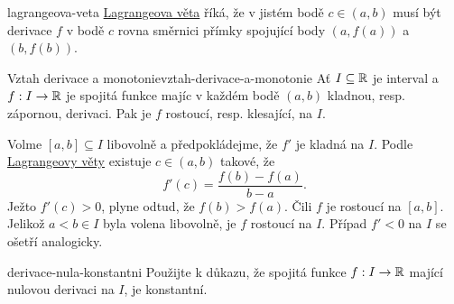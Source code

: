 \begin{remark}{}{lagrangeova-veta}
 \hyperref[thm:lagrangeova-o-stredni-hodnote]{Lagrangeova věta} říká, že v
 jistém bodě $c \in (a,b)$ musí být derivace $f$ v bodě $c$ rovna směrnici
 přímky spojující body $(a,f(a))$ a $(b,f(b))$.
\end{remark}

\begin{corollary}{Vztah derivace a monotonie}{vztah-derivace-a-monotonie}
 Ať $I \subseteq \mathbb{R}$ je interval a $f:I \to \mathbb{R}$ je spojitá funkce majíc v každém
 bodě $(a,b)$ kladnou, resp. zápornou, derivaci. Pak je $f$ rostoucí, resp.
 klesající, na $I$.
\end{corollary}
\begin{corproof}
 Volme $[a,b] \subseteq I$ libovolně a předpokládejme, že $f'$ je kladná na $I$.
 Podle \hyperref[thm:lagrangeova-o-stredni-hodnote]{Lagrangeovy věty} existuje
 $c \in (a,b)$ takové, že
 \[
  f'(c) = \frac{f(b) - f(a)}{b - a}.
 \]
 Ježto $f'(c) > 0$, plyne odtud, že $f(b) > f(a)$. Čili $f$ je rostoucí na
 $[a,b]$. Jelikož $a < b \in I$ byla volena libovolně, je $f$ rostoucí na $I$.
 Případ $f' < 0$ na $I$ se ošetří analogicky.
\end{corproof}

\begin{exercise}{}{derivace-nula-konstantni}
 Použijte  k důkazu, že spojitá
 funkce $f:I \to \mathbb{R}$ mající nulovou derivaci na $I$, je konstantní.
\end{exercise}

